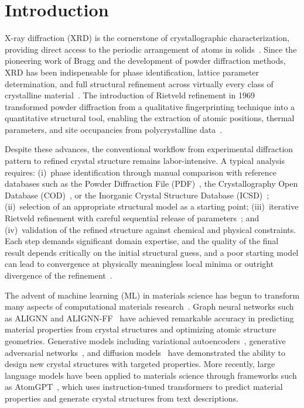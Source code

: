 \documentclass[pdflatex,sn-mathphys-num]{sn-jnl}
\theoremstyle{thmstyleone}
\theoremstyle{thmstyletwo}
\theoremstyle{thmstylethree}
\begin{document}
\section{Introduction}\label{sec:intro}

X-ray diffraction (XRD) is the cornerstone of crystallographic characterization, providing direct access to the periodic arrangement of atoms in solids~\cite{cullity2001, warren1990}. Since the pioneering work of Bragg and the development of powder diffraction methods, XRD has been indispensable for phase identification, lattice parameter determination, and full structural refinement across virtually every class of crystalline material~\cite{rietveld1969, young1993}. The introduction of Rietveld refinement in 1969 transformed powder diffraction from a qualitative fingerprinting technique into a quantitative structural tool, enabling the extraction of atomic positions, thermal parameters, and site occupancies from polycrystalline data~\cite{rietveld1969}.

Despite these advances, the conventional workflow from experimental diffraction pattern to refined crystal structure remains labor-intensive. A typical analysis requires: (i)~phase identification through manual comparison with reference databases such as the Powder Diffraction File (PDF)~\cite{gates2019}, the Crystallography Open Database (COD)~\cite{grazulis2012}, or the Inorganic Crystal Structure Database (ICSD)~\cite{bergerhoff1987}; (ii)~selection of an appropriate structural model as a starting point; (iii)~iterative Rietveld refinement with careful sequential release of parameters~\cite{toby2013}; and (iv)~validation of the refined structure against chemical and physical constraints. Each step demands significant domain expertise, and the quality of the final result depends critically on the initial structural guess, and a poor starting model can lead to convergence at physically meaningless local minima or outright divergence of the refinement~\cite{mccusker1999}.

The advent of machine learning (ML) in materials science has begun to transform many aspects of computational materials research~\cite{choudhary2022review, butler2018, schmidt2019}. Graph neural networks such as ALIGNN and ALIGNN-FF~\cite{alignn2021,choudhary2023unified} have achieved remarkable accuracy in predicting material properties from crystal structures and optimizing atomic structure geometries. Generative models including variational autoencoders~\cite{court2020}, generative adversarial networks~\cite{kim2020gan}, and diffusion models~\cite{xie2022cdvae} have demonstrated the ability to design new crystal structures with targeted properties. More recently, large language models have been applied to materials science through frameworks such as AtomGPT~\cite{atomgpt2024,diffractgpt2025,choudhary2025microscopygpt}, which uses instruction-tuned transformers to predict material properties and generate crystal structures from text descriptions.
\end{document}
